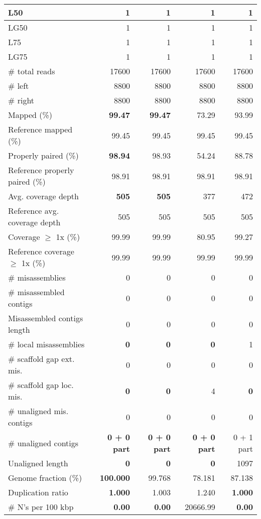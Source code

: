 \documentclass[12pt,a4paper]{article}
\begin{document}
\begin{table}[ht]
\begin{center}
\begin{tabular}{|l*{4}{|r}|}
L50 & 1 & 1 & 1 & 1 \\ \hline
LG50 & 1 & 1 & 1 & 1 \\ \hline
L75 & 1 & 1 & 1 & 1 \\ \hline
LG75 & 1 & 1 & 1 & 1 \\ \hline
\# total reads & 17600 & 17600 & 17600 & 17600 \\ \hline
\# left & 8800 & 8800 & 8800 & 8800 \\ \hline
\# right & 8800 & 8800 & 8800 & 8800 \\ \hline
Mapped (\%) & {\bf 99.47} & {\bf 99.47} & 73.29 & 93.99 \\ \hline
Reference mapped (\%) & 99.45 & 99.45 & 99.45 & 99.45 \\ \hline
Properly paired (\%) & {\bf 98.94} & 98.93 & 54.24 & 88.78 \\ \hline
Reference properly paired (\%) & 98.91 & 98.91 & 98.91 & 98.91 \\ \hline
Avg. coverage depth & {\bf 505} & {\bf 505} & 377 & 472 \\ \hline
Reference avg. coverage depth & 505 & 505 & 505 & 505 \\ \hline
Coverage $\geq$ 1x (\%) & 99.99 & 99.99 & 80.95 & 99.27 \\ \hline
Reference coverage $\geq$ 1x (\%) & 99.99 & 99.99 & 99.99 & 99.99 \\ \hline
\# misassemblies & 0 & 0 & 0 & 0 \\ \hline
\# misassembled contigs & 0 & 0 & 0 & 0 \\ \hline
Misassembled contigs length & 0 & 0 & 0 & 0 \\ \hline
\# local misassemblies & {\bf 0} & {\bf 0} & {\bf 0} & 1 \\ \hline
\# scaffold gap ext. mis. & 0 & 0 & 0 & 0 \\ \hline
\# scaffold gap loc. mis. & {\bf 0} & {\bf 0} & 4 & {\bf 0} \\ \hline
\# unaligned mis. contigs & 0 & 0 & 0 & 0 \\ \hline
\# unaligned contigs & {\bf 0 + 0 part} & {\bf 0 + 0 part} & {\bf 0 + 0 part} & 0 + 1 part \\ \hline
Unaligned length & {\bf 0} & {\bf 0} & {\bf 0} & 1097 \\ \hline
Genome fraction (\%) & {\bf 100.000} & 99.768 & 78.181 & 87.138 \\ \hline
Duplication ratio & {\bf 1.000} & 1.003 & 1.240 & {\bf 1.000} \\ \hline
\# N's per 100 kbp & {\bf 0.00} & {\bf 0.00} & 20666.99 & {\bf 0.00} \\ \hline

\end{tabular}
\end{center}
\end{table}
\end{document}
